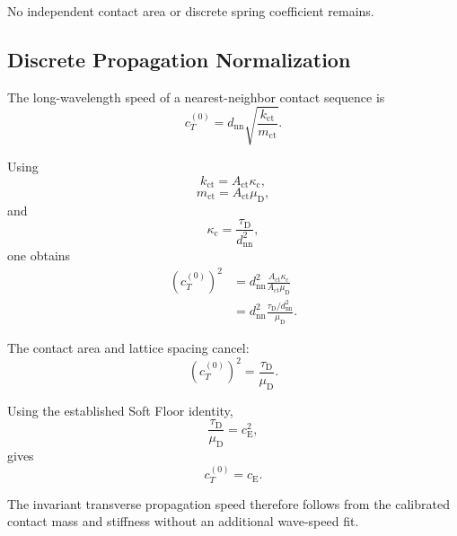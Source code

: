 No independent contact area or discrete spring coefficient remains.

\subsection{Discrete Propagation Normalization}

The long-wavelength speed of a nearest-neighbor contact sequence is
\begin{equation}
    c_T^{(0)} = d_{\mathrm{nn}} \sqrt{ \frac{k_{\mathrm{ct}}}{m_{\mathrm{ct}}} }.
\end{equation}

Using
\begin{equation}
    k_{\mathrm{ct}} = A_{\mathrm{ct}}\kappa_{\mathrm{c}},
\end{equation}
\begin{equation}
    m_{\mathrm{ct}} = A_{\mathrm{ct}}\mu_{\mathrm{D}},
\end{equation}
and
\begin{equation}
    \kappa_{\mathrm{c}} = \frac{\tau_{\mathrm{D}}}{d_{\mathrm{nn}}^2},
\end{equation}
one obtains
\begin{equation}
\begin{aligned}
    \left( c_T^{(0)} \right)^2 &= d_{\mathrm{nn}}^2 \frac{ A_{\mathrm{ct}}\kappa_{\mathrm{c}} }{ A_{\mathrm{ct}}\mu_{\mathrm{D}} } \\[3pt]
    &= d_{\mathrm{nn}}^2 \frac{ \tau_{\mathrm{D}}/d_{\mathrm{nn}}^2 }{ \mu_{\mathrm{D}} }.
\end{aligned}
\end{equation}

The contact area and lattice spacing cancel:
\begin{equation}
    \left( c_T^{(0)} \right)^2 = \frac{\tau_{\mathrm{D}}}{\mu_{\mathrm{D}}}.
\end{equation}

Using the established Soft Floor identity,
\begin{equation}
    \frac{\tau_{\mathrm{D}}}{\mu_{\mathrm{D}}} = c_{\mathrm{E}}^2,
\end{equation}
gives
\begin{equation}
    \boxed{ c_T^{(0)} = c_{\mathrm{E}} }.
\end{equation}

The invariant transverse propagation speed therefore follows from the calibrated contact mass and stiffness without an additional wave-speed fit.

